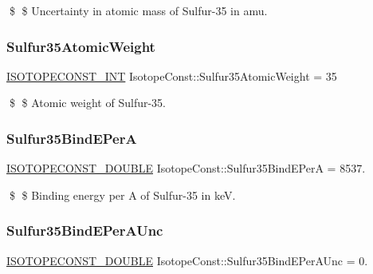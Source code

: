 \$ \$ Uncertainty in atomic mass of Sulfur-\/35 in amu. \mbox{\label{group___isotope_const-_sulfur-_s35_gadf36c5708b417860e184c8eeb39167f6}} 
\subsubsection{\texorpdfstring{Sulfur35\+Atomic\+Weight}{Sulfur35AtomicWeight}}
{\footnotesize\ttfamily \mbox{\hyperlink{group___isotope_const-_macros_ga5f18360b3e99483a35c32d789e62621c}{I\+S\+O\+T\+O\+P\+E\+C\+O\+N\+S\+T\+\_\+\+I\+NT}} Isotope\+Const\+::\+Sulfur35\+Atomic\+Weight = 35}

\$ \$ Atomic weight of Sulfur-\/35. \mbox{\label{group___isotope_const-_sulfur-_s35_gab6336d74b0f63ccd4364d46bec0e0de0}} 
\subsubsection{\texorpdfstring{Sulfur35\+Bind\+E\+PerA}{Sulfur35BindEPerA}}
{\footnotesize\ttfamily \mbox{\hyperlink{group___isotope_const-_macros_ga8f45a7272ce02c0b4c65c44636ed719a}{I\+S\+O\+T\+O\+P\+E\+C\+O\+N\+S\+T\+\_\+\+D\+O\+U\+B\+LE}} Isotope\+Const\+::\+Sulfur35\+Bind\+E\+PerA = 8537.}

\$ \$ Binding energy per A of Sulfur-\/35 in keV. \mbox{\label{group___isotope_const-_sulfur-_s35_ga4d613de9cf0f3e8f00cd1c3f92b600cc}} 
\subsubsection{\texorpdfstring{Sulfur35\+Bind\+E\+Per\+A\+Unc}{Sulfur35BindEPerAUnc}}
{\footnotesize\ttfamily \mbox{\hyperlink{group___isotope_const-_macros_ga8f45a7272ce02c0b4c65c44636ed719a}{I\+S\+O\+T\+O\+P\+E\+C\+O\+N\+S\+T\+\_\+\+D\+O\+U\+B\+LE}} Isotope\+Const\+::\+Sulfur35\+Bind\+E\+Per\+A\+Unc = 0.}

